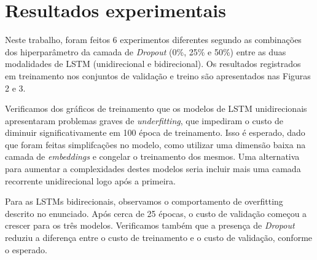 \documentclass{article}
\begin{document}
\newpage

\section{Resultados experimentais}

Neste trabalho, foram feitos 6 experimentos diferentes segundo as combinações dos hiperparâmetro da camada de \textit{Dropout} (0\%, 25\% e 50\%) entre as duas modalidades de LSTM (unidirecional e bidirecional). Os resultados registrados em treinamento nos conjuntos de validação e treino são apresentados nas Figuras 2 e 3. 

Verificamos dos gráficos de treinamento que os modelos de LSTM unidirecionais apresentaram problemas graves de \textit{underfitting}, que impediram o custo de diminuir significativamente em 100 época de treinamento. Isso é esperado, dado que foram feitas simplifcações no modelo, como utilizar uma dimensão baixa na camada de \textit{embeddings} e congelar o treinamento dos mesmos. Uma alternativa para aumentar a complexidades destes modelos seria incluir mais uma camada recorrente unidirecional logo após a primeira.  

Para as LSTMs bidirecionais, observamos o comportamento de overfitting descrito no enunciado. Após cerca de 25 épocas, o custo de validação começou a crescer para os três modelos. Verificamos também que a presença de \textit{Dropout} reduziu a diferença entre o custo de treinamento e o custo de validação, conforme o esperado.


\printbibliography
\end{document}
